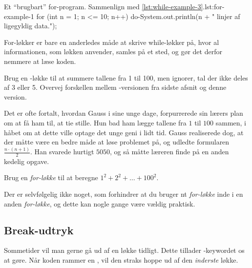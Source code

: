 		\begin{JavaCode}{Et ``brugbart'' for-program. Sammenlign med \autoref{lst:while-example-3}.}{lst:for-example-1}
			for (int n = 1; n <= 10; n++) {
				do-System.out.println(n + " linjer af ligegyldig data.");
			}
		\end{JavaCode}

        For-løkker er bare en anderledes måde at skrive while-løkker
        på, hvor al informationen, som løkken anvender, samles på et
        sted, og gør det derfor nemmere at læse koden.

		\begin{exercise}
            Brug en -løkke til at summere tallene
            fra 1 til 100, men ignorer, tal der ikke deles af 3 eller
            5. Overvej forskellen mellem -versionen
            fra sidste afsnit og denne version.
        \end{exercise}

		\begin{exercise}
			Det er ofte fortalt, hvordan Gauss i sine unge dage, forpurrerede sin
			lærers plan om at få ham til, at tie stille. Hun bad ham lægge tallene
			fra \(1\) til \(100\) sammen, i håbet om at dette ville optage det unge
			geni i lidt tid. Gauss realiserede dog, at der måtte være en bedre måde
			at løse problemet på, og udledte formularen \(\frac{n\cdot(n+1)}{2}\).
			Han svarede hurtigt \(5050\), og så måtte læreren finde på en anden
			kedelig opgave.


			Brug en \emph{for-løkke} til at beregne \(1^2+2^2+\dots+100^2\).
		\end{exercise}

		\begin{exercise}
			Der er selvfølgelig ikke noget, som forhindrer at du bruger nt
			\emph{for-løkke} inde i en anden \emph{for-løkke}, og dette kan nogle gange
			være vældig praktisk.

			\todo{Find på opgave!}
		\end{exercise}

	\subsection{Break-udtryk}

		Sommetider vil man gerne gå ud af en løkke tidligt. Dette tillader
        -keywordet os at gøre. Når koden rammer en
        , vil den straks hoppe ud af den
        \emph{inderste} løkke.


